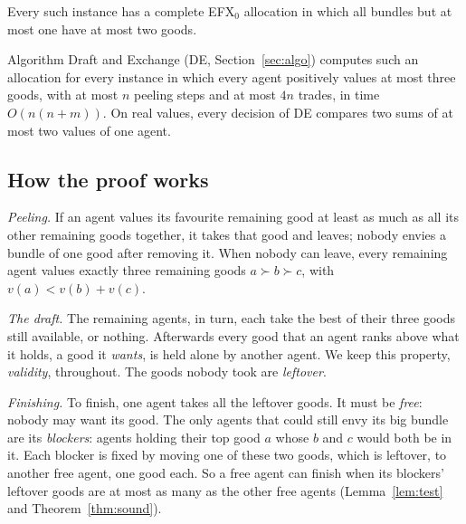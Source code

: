 \documentclass[runningheads,11pt]{llncs}
\newcommand{\efxz}{\texorpdfstring{\mbox{EFX$_0$}}{EFX0}}
\newcommand{\DE}{\textup{DE}}
\begin{document}
\begin{theorem}\label{thm:D}
Every such instance has a complete \efxz{} allocation in which all bundles but at most one have at most two goods.
\end{theorem}

\begin{theorem}[algorithm]\label{thm:algo}
Algorithm Draft and Exchange (\DE{}, Section~\ref{sec:algo}) computes such an allocation for every instance in which every agent positively values at most three goods, with at most $n$ peeling steps and at most $4n$ trades, in time $O(n(n+m))$. On real values, every decision of \DE{} compares two sums of at most two values of one agent.
\end{theorem}

\subsection{How the proof works}\label{sec:overview}

\emph{Peeling.} If an agent values its favourite remaining good at least as much as all its other remaining goods together, it takes that good and leaves; nobody envies a bundle of one good after removing it. When nobody can leave, every remaining agent values exactly three remaining goods $a\succ b\succ c$, with $v(a)<v(b)+v(c)$.

\emph{The draft.} The remaining agents, in turn, each take the best of their three goods still available, or nothing. Afterwards every good that an agent ranks above what it holds, a good it \emph{wants}, is held alone by another agent. We keep this property, \emph{validity}, throughout. The goods nobody took are \emph{leftover}.

\emph{Finishing.} To finish, one agent takes all the leftover goods. It must be \emph{free}: nobody may want its good. The only agents that could still envy its big bundle are its \emph{blockers}: agents holding their top good $a$ whose $b$ and $c$ would both be in it. Each blocker is fixed by moving one of these two goods, which is leftover, to another free agent, one good each. So a free agent can finish when its blockers' leftover goods are at most as many as the other free agents (Lemma~\ref{lem:test} and Theorem~\ref{thm:sound}).
\end{document}
